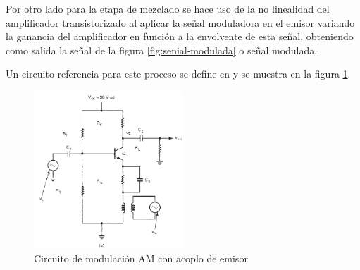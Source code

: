 \documentclass[conference]{IEEEtran}
\begin{document}
	Por otro lado para la etapa de mezclado se hace uso de la no linealidad del amplificador transistorizado al aplicar la señal moduladora en el emisor variando la ganancia del amplificador en función a la envolvente de esta señal, obteniendo como salida la señal de la figura \ref{fig:senial-modulada} o señal modulada.
	
	Un circuito referencia para este proceso se define en \cite{tomasi_comunicaciones} y se muestra en la figura \ref{fig:circuito-modulante-tomasi}. 
	
	\newpage
	
	\begin{figure}[h]
		\centering
		\includegraphics[width=0.5\textwidth]{media/circuito-modulante-tomasi}
		\caption{Circuito de modulación AM con acoplo de emisor}
		\label{fig:circuito-modulante-tomasi}
	\end{figure}
	
	
	
	
\end{document}

